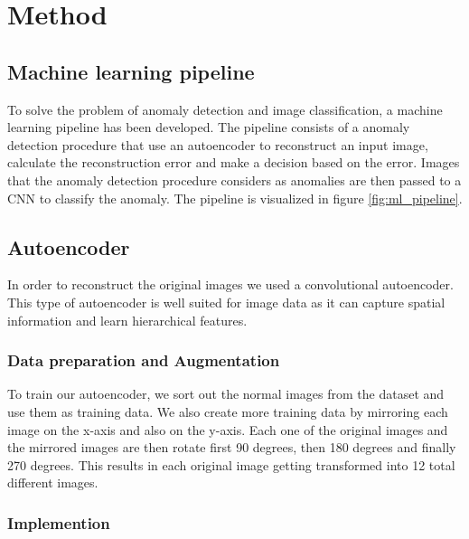 \section{Method}

\subsection{Machine learning pipeline}
To solve the problem of anomaly detection and image classification, a machine learning pipeline has been developed. The pipeline consists of a anomaly detection procedure that use an autoencoder to reconstruct an input image, calculate the reconstruction error and make a decision based on the error. Images that the anomaly detection procedure considers as anomalies are then passed to a CNN to classify the anomaly. The pipeline is visualized in figure \ref{fig:ml_pipeline}.


\subsection{Autoencoder}
In order to reconstruct the original images we used a convolutional autoencoder. This type of autoencoder is well suited for image data as it can capture spatial information and learn hierarchical features. 

\subsubsection{Data preparation and Augmentation}

To train our autoencoder, we sort out the normal images from the dataset and use them as training data. We also create more training data by mirroring each image on the x-axis and also on the y-axis. Each one of the original images and the mirrored images are then rotate first 90 degrees, then 180 degrees and finally 270 degrees. This results in each original image getting transformed into 12 total different images.

\subsubsection{Implemention}

